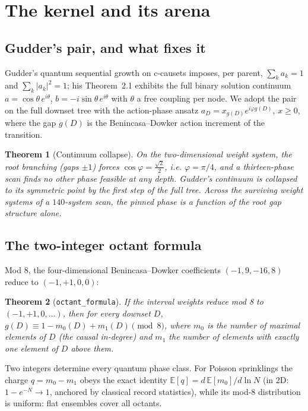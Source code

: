 \documentclass[11pt]{article}
\newtheorem{theorem}{Theorem}[section]
\begin{document}
\section{The kernel and its arena}

\subsection{Gudder's pair, and what fixes it}
Gudder's quantum sequential growth on c-causets \cite{gudder} imposes,
per parent, $\sum_k a_k=1$ and $\sum_k\lvert a_k\rvert^2=1$; his
Theorem~2.1 exhibits the full binary solution continuum
$a=\cos\theta\,e^{i\theta}$, $b=-i\sin\theta\,e^{i\theta}$ with
$\theta$ a free coupling per node.  We adopt the pair on the full
downset tree with the action-phase ansatz
$a_D=x_{g(D)}e^{i\varphi g(D)}$, $x\ge0$, where the gap $g(D)$ is the
Benincasa--Dowker action increment of the transition.

\begin{theorem}[Continuum collapse]
On the two-dimensional weight system, the root branching (gaps
$\pm1$) forces $\cos\varphi=\tfrac{\sqrt2}{2}$, i.e.
$\varphi=\pi/4$, and a thirteen-phase scan finds no other phase
feasible at any depth.  Gudder's continuum is collapsed to its
symmetric point by the first step of the full tree.  Across the
surviving weight systems of a $140$-system scan, the pinned phase is a
function of the root gap structure alone.
\end{theorem}

\subsection{The two-integer octant formula}
Mod 8, the four-dimensional Benincasa--Dowker coefficients
$(-1,9,-16,8)$ reduce to $(-1,+1,0,0)$:

\begin{theorem}[\texttt{octant\_formula}]
If the interval weights reduce mod 8 to $(-1,+1,0,\dots)$, then for
every downset $D$,
$g(D)\equiv 1-m_0(D)+m_1(D)\pmod 8$, where $m_0$ is the number of
maximal elements of $D$ (the causal in-degree) and $m_1$ the number of
elements with exactly one element of $D$ above them.
\end{theorem}

Two integers determine every quantum phase class.  For Poisson
sprinklings the charge $q=m_0-m_1$ obeys the exact identity
$\mathbb{E}[q]=d\,\mathbb{E}[m_0]/d\ln N$ (in 2D:
$1-e^{-N}\to1$, anchored by classical record statistics), while its
mod-8 distribution is uniform: flat ensembles cover all octants.
\end{document}
